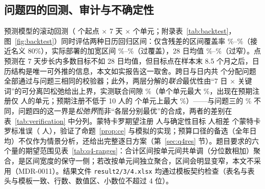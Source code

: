 \subsection{问题四的回测、审计与不确定性}
\label{sec:val-q4}
预测模型的滚动回测（\valBacktestOrigins{} 个起点 $\times$ 7 天 $\times$ \valBacktestUnits{} 个单元；附录表~\ref{tab:backtest}，图~\ref{fig:backtest}）同时评估两种日历回归区间：仅含残差的区间覆盖率 \valBacktestCalendarCoverageMin\%--\valBacktestCalendarCoverageMax\%（接近名义 80\%），实际部署的加宽区间 \valBacktestWideCoverageMin\%--\valBacktestWideCoverageMax\%（过覆盖），28 日均值 \valBacktestMeanCoverageMin\%--\valBacktestMeanCoverageMax\%（过窄）。点预测在 7 天步长内多数目标不如 28 日均值，但目标点在样本末 8.5 个月之后，日历结构是唯一可外推的信息，本文如实报告这一取舍。跨日与日内共 \valQfourAuditGroups{} 个分配问题全部通过与问题三相同的校验器；此外，两层分解的\emph{联合}最优性由“7 日 $\times$ 关键词”的可分离凹松弛给出上界，实测联合间隙 \valQfourJointGapPct\%（单个单元最大 \valQfourJointMaxGapPct\%，出现在预期注册仅 \valQfourJointMaxGapUnitRegs{} 人的单元；预期注册不低于 10 人的 \valQfourJointBigUnits{} 个单元上最大 \valQfourJointMaxGapBigPct\%）——与问题三的 \valQthreeAggregateGapPct\% 不同，问题四的这一界是\emph{松弛界}而非“各层分别最优”的合成，两者的差别在表~\ref{tab:verification} 中分列。蒙特卡罗期望注册 \valQfourRegsMean{} 人与确定性目标 \valQfourDetRegs{} 人相差 \valQfourRegsMcZ{} 个蒙特卡罗标准误（\valQfourRegsMcSe{} 人），验证了命题~\ref{prop:ce} 与模拟的实现；预算口径的备选（全年日均）不仅作为情景分析，还给出完整逐日方案（第~\ref{sec:q4res} 节）。题目要求的六个量的期望范围见表~\ref{tab:q4-ranges}：合计区间按单元间共单调（分位数相加）聚合，是区间宽度的保守一侧；若改按单元间独立聚合，区间会明显变窄，本文不采用（MDR-0011）。结果文件 \texttt{result2/3/4.xlsx} 均通过模板契约检查（表名与表头与模板一致、行数、数值区、小数位不超过 4 位）。
